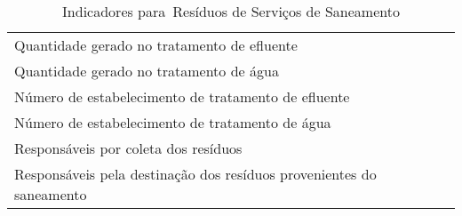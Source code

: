 \begin{table}[h!]
  \centering
  \caption{Indicadores para Resíduos de Serviços de Saneamento}
    \begin{tabular}{|p{22.715em}|}
    \rowcolor[rgb]{ .984,  .831,  .706} \multicolumn{1}{p{22.715em}}{RESÍDUOS DE SERVIÇOS DE SANEAMENTO} \\
    \midrule
    Quantidade gerado no tratamento de efluente \\
    \midrule
    Quantidade gerado no tratamento de água \\
    \midrule
    Número de estabelecimento de tratamento de efluente \\
    \midrule
    Número de estabelecimento de tratamento de água \\
    \midrule
    Responsáveis por coleta dos resíduos \\
    \midrule
    Responsáveis pela destinação dos resíduos provenientes do saneamento  \\
    \bottomrule
    \end{tabular}%
  \label{tab:ind_saneamento}%
\end{table}%

